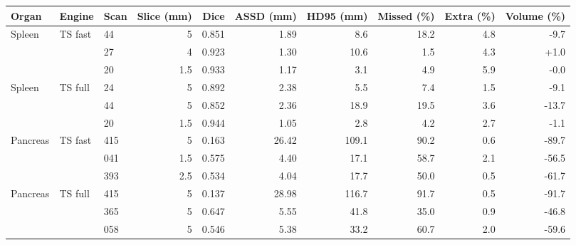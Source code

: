 \begin{tabular}{lllrrrrrrr}
\toprule
Organ & Engine & Scan & Slice (mm) & Dice & ASSD (mm) & HD95 (mm) & Missed (\%) & Extra (\%) & Volume (\%) \\
\midrule
Spleen & TS fast & 44 & 5 & 0.851 & 1.89 & 8.6 & 18.2 & 4.8 & -9.7 \\
 &  & 27 & 4 & 0.923 & 1.30 & 10.6 & 1.5 & 4.3 & +1.0 \\
 &  & 20 & 1.5 & 0.933 & 1.17 & 3.1 & 4.9 & 5.9 & -0.0 \\
\midrule
Spleen & TS full & 24 & 5 & 0.892 & 2.38 & 5.5 & 7.4 & 1.5 & -9.1 \\
 &  & 44 & 5 & 0.852 & 2.36 & 18.9 & 19.5 & 3.6 & -13.7 \\
 &  & 20 & 1.5 & 0.944 & 1.05 & 2.8 & 4.2 & 2.7 & -1.1 \\
\midrule
Pancreas & TS fast & 415 & 5 & 0.163 & 26.42 & 109.1 & 90.2 & 0.6 & -89.7 \\
 &  & 041 & 1.5 & 0.575 & 4.40 & 17.1 & 58.7 & 2.1 & -56.5 \\
 &  & 393 & 2.5 & 0.534 & 4.04 & 17.7 & 50.0 & 0.5 & -61.7 \\
\midrule
Pancreas & TS full & 415 & 5 & 0.137 & 28.98 & 116.7 & 91.7 & 0.5 & -91.7 \\
 &  & 365 & 5 & 0.647 & 5.55 & 41.8 & 35.0 & 0.9 & -46.8 \\
 &  & 058 & 5 & 0.546 & 5.38 & 33.2 & 60.7 & 2.0 & -59.6 \\
\bottomrule
\end{tabular}

